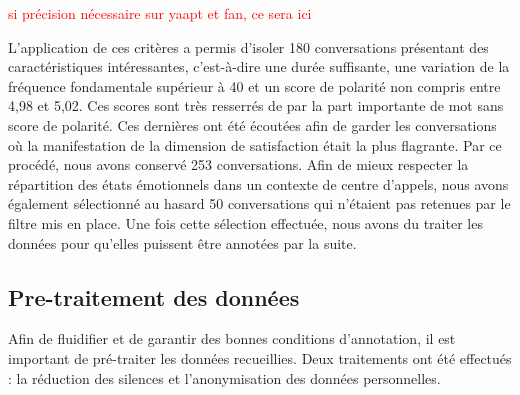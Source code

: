 \textcolor{red}{si précision nécessaire sur yaapt et fan, ce sera ici}

L'application de ces critères a permis d'isoler 180 conversations présentant des caractéristiques intéressantes, c'est-à-dire une durée suffisante, une variation de la fréquence fondamentale supérieur à 40 et un score de polarité non compris entre 4,98 et 5,02. Ces scores sont très resserrés de par la part importante de mot sans score de polarité. Ces dernières ont été écoutées afin de garder les conversations où la manifestation de la dimension de satisfaction était la plus flagrante. Par ce procédé, nous avons conservé 253 conversations.
Afin de mieux respecter la répartition des états émotionnels dans un contexte de centre d'appels, nous avons également sélectionné au hasard 50 conversations qui n'étaient pas retenues par le filtre mis en place.
Une fois cette sélection effectuée, nous avons du traiter les données pour qu'elles puissent être annotées par la suite.

\subsection{Pre-traitement des données}
Afin de fluidifier et de garantir des bonnes conditions d'annotation, il est important de pré-traiter les données recueillies. Deux traitements ont été effectués : la réduction des silences et l'anonymisation des données personnelles.

